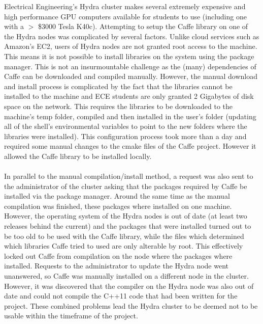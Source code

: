 \documentclass[12pt]{article}
\begin{document}
	Electrical Engineering's Hydra cluster makes several extremely expensive and high performance GPU computers available for students to use (including one with a $>$ \$3000 Tesla K40c).  Attempting to setup the Caffe library on one of the Hydra nodes was complicated by several factors.  Unlike cloud services such as Amazon's EC2, users of Hydra nodes are not granted root access to the machine.  This means it is not possible to install libraries on the system using the package manager.  This is not an insurmountable challenge as the (many) dependencies of Caffe can be downloaded and compiled manually.  However, the manual download and install process is complicated by the fact that the libraries cannot be installed to the machine and ECE students are only granted 2 Gigabytes of disk space on the network.  This requires the libraries to be downloaded to the machine's temp folder, compiled and then installed in the user's folder (updating all of the shell's environmental variables to point to the new folders where the libraries were installed).  This configuration process took more than a day and required some manual changes to the cmake files of the Caffe project. However it allowed the Caffe library to be installed locally.\\
\\
	In parallel to the manual compilation/install method, a request was also sent to the administrator of the cluster asking that the packages required by Caffe be installed via the package manager.  Around the same time as the manual compilation was finished, these packages where installed on one machine.  However, the operating system of the Hydra nodes is out of date (at least two releases behind the current) and the packages that were installed turned out to be too old to be used with the Caffe library, while the files which determined which libraries Caffe tried to used are only alterable by root.  This effectively locked out Caffe from compilation on the node where the packages where installed.  Requests to the administrator to update the Hydra node went unanswered, so Caffe was manually installed on a different node in the cluster.  However, it was discovered that the compiler on the Hydra node was also out of date and could not compile the C++11 code that had been written for the project.  These combined problems lead the Hydra cluster to be deemed not to be usable within the timeframe of the project.
\end{document}
